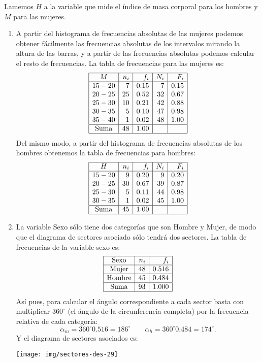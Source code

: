 {Lamemos $H$ a la variable que mide el índice de masa corporal para los hombres y $M$ para las mujeres.
\begin{enumerate}
\item A partir del histograma de frecuencias absolutas de las mujeres podemos obtener fácilmente las frecuencias absolutas de los intervalos mirando la altura de las barras, y a partir de las frecuencias absolutas podemos calcular el resto de frecuencias.
La tabla de frecuencias para las mujeres es:
\[
\begin{array}{|c|r|r|r|r|}
\hline
   M   & n_i &  f_i & N_i &  F_i \\
\hline
 15-20 &   7 & 0.15 &   7 & 0.15 \\
 20-25 &  25 & 0.52 &  32 & 0.67 \\
 25-30 &  10 & 0.21 &  42 & 0.88 \\
 30-35 &   5 & 0.10 &  47 & 0.98 \\
 35-40 &   1 & 0.02 &  48 & 1.00 \\
\hline
\mbox{Suma} & 48 & 1.00 & & \\
\hline
\end{array}
\]
Del mismo modo, a partir del histograma de frecuencias absolutas de los hombres obtenemos la tabla de frecuencias para hombres:
\[
\begin{array}{|c|r|r|r|r|}
\hline
   H   & n_i &  f_i & N_i &  F_i \\
\hline
 15-20 &   9 & 0.20 &   9 & 0.20 \\
 20-25 &  30 & 0.67 &  39 & 0.87 \\
 25-30 &   5 & 0.11 &  44 & 0.98 \\
 30-35 &   1 & 0.02 &  45 & 1.00 \\
\hline
\mbox{Suma} & 45 & 1.00 & & \\
\hline
\end{array}
\]

\item La variable Sexo sólo tiene dos categorías que son Hombre y Mujer, de modo que el diagrama de sectores asociado sólo tendrá dos sectores. La tabla de frecuencias de la variable sexo es:
\[
\begin{array}{|c|r|r|}
\hline
  \textrm{Sexo}  & n_i &   f_i \\
\hline
 \textrm{Mujer}  &  48 & 0.516 \\
\hline
 \textrm{Hombre} &  45 & 0.484 \\
\hline
  \textrm{Suma}  &  93 & 1.000 \\
\hline
\end{array}
\]
Así pues, para calcular el ángulo correspondiente a cada sector basta con multiplicar $360^{\circ}$ (el ángulo de la circunferencia completa) por la frecuencia relativa de cada categoría:
\[
\alpha_m=360^{\circ}0.516=186^{\circ}\qquad \alpha_h=360^{\circ}0.484=174^{\circ}.
\]
Y el diagrama de sectores asociados es:
\begin{center}
\texttt{[image: img/sectores-des-29]}
\end{center}


\end{enumerate}}
